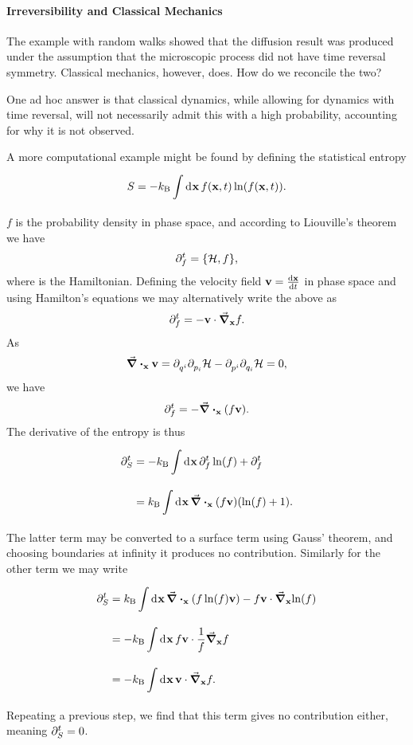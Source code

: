 \paragraph{Irreversibility and Classical Mechanics}
The example with random walks showed that the diffusion result was produced under the assumption that the microscopic process did not have time reversal symmetry. Classical mechanics, however, does. How do we reconcile the two?

One ad hoc answer is that classical dynamics, while allowing for dynamics with time reversal, will not necessarily admit this with a high probability, accounting for why it is not observed.

A more computational example might be found by defining the statistical entropy
\begin{align*}
	S = -k_{\text{B}}\int\limits_{}^{}\dd[]{\vb{x}}f(\vb{x}, t)\ln(f(\vb{x}, t)).
\end{align*}
$f$ is the probability density in phase space, and according to Liouville's theorem we have
\begin{align*}
	\del{t}{f} = \pb{\ham}{f},
\end{align*}
where \ham is the Hamiltonian. Defining the velocity field $\vb{v} = \dv{\vb{x}}{t}$ in phase space and using Hamilton's equations we may alternatively write the above as
\begin{align*}
	\partial^{t}_{f}= -\vb{v}\cdot\grad_{\vb{x}}{f}.
\end{align*}
As
\begin{align*}
	\div_{\vb{x}}{\vb{v}} = \partial^{}_{q^{i}}\partial^{}_{p_{i}}\mathcal{H} - \partial^{}_{p^{i}}\partial^{}_{q_{i}}\mathcal{H} = 0,
\end{align*}
we have
\begin{align*}
	\partial^{t}_{f}= -\div_{\vb{x}}{(f\vb{v})}.
\end{align*}
The derivative of the entropy is thus
\begin{align*}
	\del{t}{S} &= -\kb\integ{}{}{\vb{x}}{\del{t}{f}\ln(f) + \del{t}{f}} \\
	           &= \kb\integ{}{}{\vb{x}}{\div_{\vb{x}}{(f\vb{v})}(\ln(f) + 1)}.
\end{align*}
The latter term may be converted to a surface term using Gauss' theorem, and choosing boundaries at infinity it produces no contribution. Similarly for the other term we may write
\begin{align*}
	\del{t}{S} &= \kb\integ{}{}{\vb{x}}{\div_{\vb{x}}{(f\ln(f)\vb{v})} - f\vb{v}\cdot\grad_{\vb{x}}{\ln(f)}} \\
	           &= -\kb\integ{}{}{\vb{x}}{f\vb{v}\cdot\frac{1}{f}\grad_{\vb{x}}{f}} \\
	           &= -\kb\integ{}{}{\vb{x}}{\vb{v}\cdot\grad_{\vb{x}}{f}}.
\end{align*}
Repeating a previous step, we find that this term gives no contribution either, meaning $\partial^{t}_{S}= 0$.

